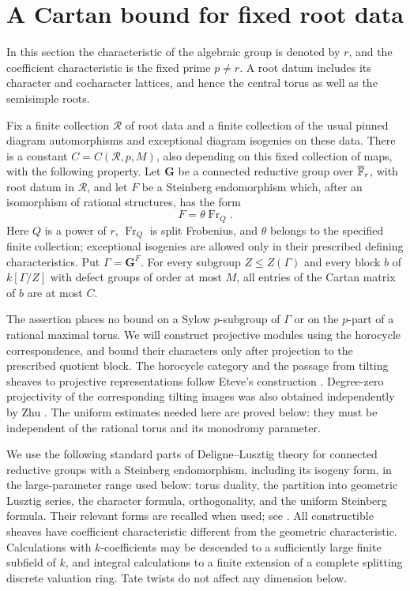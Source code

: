 \section{A Cartan bound for fixed root data}\label{sec:geometry}

In this section the characteristic of the algebraic group is denoted by
\(r\), and the coefficient characteristic is the fixed prime \(p\ne r\).
A root datum includes its character and cocharacter lattices, and hence
the central torus as well as the semisimple roots.

\begin{theorem}\label{thm:geometric-cartan}
Fix a finite collection \(\mathcal R\) of root data and a finite collection
of the usual pinned diagram automorphisms and exceptional diagram
isogenies on these data. There is a constant \(C=C(\mathcal R,p,M)\), also
depending on this fixed collection of maps, with the following property.
Let \(\mathbf G\) be a connected reductive group over
\(\overline{\mathbb F}_r\), with root datum in \(\mathcal R\), and let \(F\) be a
Steinberg endomorphism which, after an isomorphism of rational structures,
has the form
\[
 F=\theta\operatorname{Fr}_Q.
\]
Here \(Q\) is a power of \(r\), \(\operatorname{Fr}_Q\) is split
Frobenius, and \(\theta\) belongs to the specified finite collection;
exceptional isogenies are allowed only in their prescribed defining
characteristics. Put \(\Gamma=\mathbf G^F\).
For every subgroup \(Z\le Z(\Gamma)\) and every block \(b\) of
\(k[\Gamma/Z]\) with defect groups of order at most \(M\), all entries of
the Cartan matrix of \(b\) are at most \(C\).
\end{theorem}

The assertion places no bound on a Sylow \(p\)-subgroup of \(\Gamma\)
or on the \(p\)-part of a rational maximal torus. We will construct
projective modules using the horocycle correspondence, and bound their
characters only after projection to the prescribed quotient block.
The horocycle category and the passage from tilting sheaves to
projective representations follow Eteve's construction
\cite[Lemma~2.1.1 and Theorems~2.3.2, 3.1.1(ii), 3.2.4]{Eteve}.
Degree-zero projectivity of the corresponding tilting images was
also obtained independently by Zhu
\cite[Theorem~4.91]{ZhuTame}.  The uniform estimates needed here
are proved below: they must be independent of the rational torus
and its monodromy parameter.

We use the following standard parts of Deligne--Lusztig theory for
connected reductive groups with a Steinberg endomorphism, including its
isogeny form, in the large-parameter range used below: torus duality,
the partition into geometric Lusztig series,
the character formula, orthogonality, and the uniform Steinberg formula.
Their relevant forms are recalled when used; see
\cite[Theorems~4.2, 6.2 and 6.8, Proposition~5.22,
Corollaries~6.3 and 7.14, and Section~11]{DL}.
All constructible sheaves have coefficient characteristic different from
the geometric characteristic. Calculations with \(k\)-coefficients may
be descended to a sufficiently large finite subfield of \(k\), and
integral calculations to a finite extension of a complete splitting
discrete valuation ring. Tate twists do not affect any dimension below.

